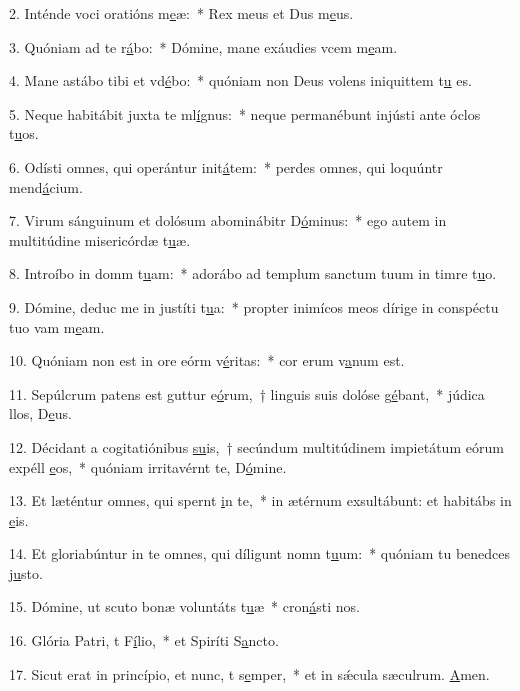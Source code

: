 2. Inténde voci oratións m\uline{e}æ:~* Rex meus et Dus m\uline{e}us.\par 
3. Quóniam ad te r\uline{á}bo:~* Dómine, mane exáudies vcem m\uline{e}am.\par 
4. Mane astábo tibi et vd\uline{é}bo:~* quóniam non Deus volens iniquittem t\uline{u} es.\par 
5. Neque habitábit juxta te ml\uline{í}gnus:~* neque permanébunt injústi ante óclos t\uline{u}os.\par 
6. Odísti omnes, qui operántur init\uline{á}tem:~* perdes omnes, qui loquúntr mend\uline{á}cium.\par 
7. Virum sánguinum et dolósum abominábitr D\uline{ó}minus:~* ego autem in multitúdine misericórdæ t\uline{u}æ.\par 
8. Introíbo in domm t\uline{u}am:~* adorábo ad templum sanctum tuum in timre t\uline{u}o.\par 
9. Dómine, deduc me in justíti t\uline{u}a:~* propter inimícos meos dírige in conspéctu tuo vam m\uline{e}am.\par 
10. Quóniam non est in ore eórm v\uline{é}ritas:~* cor erum v\uline{a}num est.\par 
11. Sepúlcrum patens est guttur e\uline{ó}rum,~† linguis suis dolóse g\uline{é}bant,~* júdica llos, D\uline{e}us.\par 
12. Décidant a cogitatiónibus \uline{su}is,~† secúndum multitúdinem impietátum eórum expéll \uline{e}os,~* quóniam irritavérnt te, D\uline{ó}mine.\par 
13. Et læténtur omnes, qui spernt \uline{i}n te,~* in ætérnum exsultábunt: et habitábs in \uline{e}is.\par 
14. Et gloriabúntur in te omnes, qui díligunt nomn t\uline{u}um:~* quóniam tu benedces j\uline{u}sto.\par 
15. Dómine, ut scuto bonæ voluntáts t\uline{u}æ~* cron\uline{á}sti nos.\par 
16. Glória Patri, t F\uline{í}lio,~* et Spiríti S\uline{a}ncto.\par 
17. Sicut erat in princípio, et nunc, t s\uline{e}mper,~* et in sǽcula sæculrum. \uline{A}men.\par 
